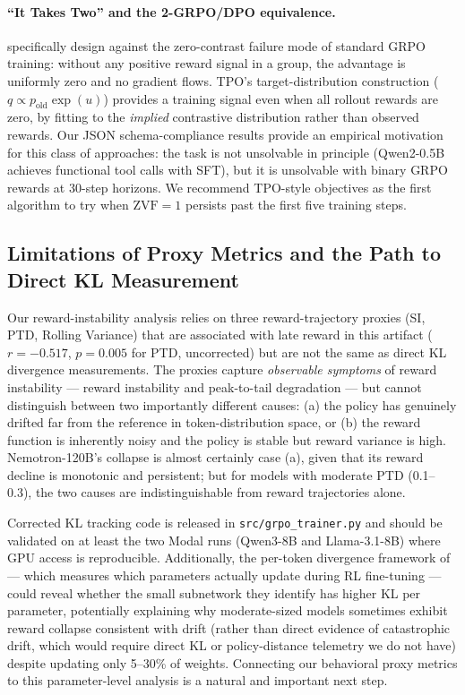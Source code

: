 \paragraph{``It Takes Two'' and the 2-GRPO/DPO equivalence.}
\citet{wu2025grpo_dpo} specifically design against the zero-contrast failure mode
of standard GRPO training: without any positive reward signal in a group,
the advantage is uniformly zero and no gradient flows.
TPO's target-distribution construction ($q \propto p_\text{old} \exp(u)$)
provides a training signal even when all rollout rewards are zero, by fitting
to the \emph{implied} contrastive distribution rather than observed rewards.
Our JSON schema-compliance results provide an empirical motivation for this class of
approaches: the task is not unsolvable in principle (Qwen2-0.5B achieves
functional tool calls with SFT), but it is unsolvable with binary GRPO
rewards at 30-step horizons.
We recommend TPO-style objectives as the first algorithm to try when
$\text{ZVF} = 1$ persists past the first five training steps.

\subsection{Limitations of Proxy Metrics and the Path to Direct KL Measurement}
\label{sec:discuss_kl}

Our reward-instability analysis relies on three reward-trajectory proxies (SI, PTD,
Rolling Variance) that are associated with late reward in this artifact
($r = -0.517$, $p = 0.005$ for PTD, uncorrected) but are not the same as direct
KL divergence measurements.
The proxies capture \emph{observable symptoms} of reward instability --- reward
instability and peak-to-tail degradation --- but cannot distinguish between
two importantly different causes: (a) the policy has genuinely drifted far from
the reference in token-distribution space, or (b) the reward function is
inherently noisy and the policy is stable but reward variance is high.
Nemotron-120B's collapse is almost certainly case (a), given that its reward
decline is monotonic and persistent; but for models with moderate PTD (0.1--0.3),
the two causes are indistinguishable from reward trajectories alone.

Corrected KL tracking code is released in \texttt{src/grpo\_trainer.py} and
should be validated on at least the two Modal runs (Qwen3-8B and
Llama-3.1-8B) where GPU access is reproducible.
Additionally, the per-token divergence framework of \citet{liu2025rlsubnetworks}
--- which measures which parameters actually update during RL fine-tuning ---
could reveal whether the small subnetwork they identify has higher KL per
parameter, potentially explaining why moderate-sized models sometimes exhibit reward collapse consistent with drift (rather than direct evidence of catastrophic drift, which would require direct KL or policy-distance telemetry we do not have) despite updating only 5--30\% of weights.
Connecting our behavioral proxy metrics to this parameter-level analysis is a
natural and important next step.


